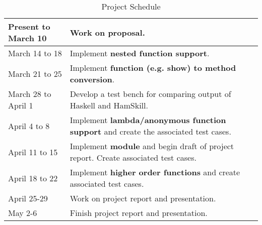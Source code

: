 \documentclass{report}
\begin{document}
\begin{table}[h]

\begin{center}
  \begin{tabular}{ | >{\centering\arraybackslash}m{1in} || m{3in} | }
    \hline
    Present to March 10 & Work on proposal. \\ \hline
    March 14 to 18 & Implement \textbf{nested function support}. \\ \hline
    March 21 to 25 & Implement \textbf{function (e.g. show) to method conversion}. \\ \hline
    March 28 to April 1 & Develop a test bench for comparing output of Haskell and HamSkill. \\ \hline
    April 4 to 8 & Implement \textbf{lambda/anonymous function support} and create the associated test cases. \\ \hline
    April 11 to 15 & Implement \textbf{module} and begin draft of project report.  Create associated test cases. \\ \hline
    April 18 to 22 & Implement \textbf{higher order functions} and create associated test cases. \\ \hline
    April 25-29 & Work on project report and presentation.  \\ \hline
    May 2-6 & Finish project report and presentation.  \\ \hline
  \end{tabular}
\end{center}
\caption{Project Schedule}\label{tab:projectSchedule}
\end{table}

\pagebreak


\end{document}
